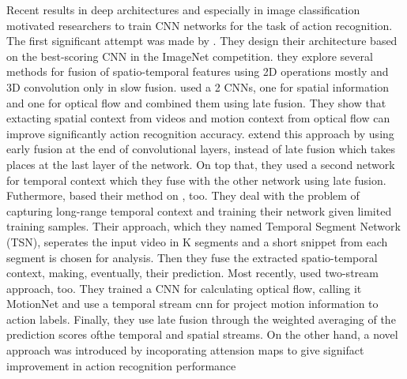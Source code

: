\documentclass{report}
\begin{document}
Recent results in deep architectures and especially in image classification motivated researchers to train CNN networks for
the task of action recognition. The first significant attempt was made by \cite{6909619}. They design their architecture based on the best-scoring CNN
in the ImageNet competition. they explore several methods for fusion of spatio-temporal features using 2D operations mostly and 3D convolution only in slow fusion.
\cite{simonyan2014two}  used a 2 CNNs, one for spatial information and one for optical flow and combined them using late fusion.
They show that extacting spatial context from videos and motion context from optical flow can improve significantly action recognition accuracy.
\cite{DBLP:journals/corr/FeichtenhoferPZ16} extend this approach by using early fusion at the end of convolutional layers,  instead of late fusion which
takes places at the last layer of the network. On top that, they used a second network for temporal context which they fuse with the other network using late
fusion. Futhermore, \cite{DBLP:journals/corr/WangXW0LTG16} based their method on \cite{simonyan2014two}, too. They deal with the problem of capturing long-range
temporal context and training their network given limited training samples. Their approach, which they named Temporal Segment Network (TSN), seperates the input
video in K segments and a short snippet from each segment is chosen for analysis. Then they fuse  the extracted spatio-temporal context, making, eventually, their
prediction.
Most recently,\cite{DBLP:journals/corr/ZhuLNH17a} used two-stream approach, too. They trained a CNN for calculating optical flow, calling it
MotionNet and use a temporal stream cnn for project motion information to action labels. Finally, they use late fusion through the weighted averaging of the prediction scores ofthe temporal and spatial streams. On the other hand, a novel approach was introduced by \cite{DBLP:journals/corr/abs-1711-01467} incoporating attension maps to give signifact improvement in action recognition performance \par 
\end{document}
